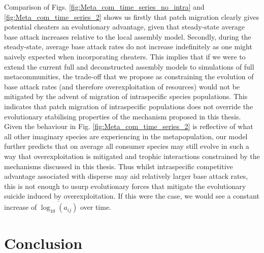 \documentclass[a4paper]{report}
\DeclareMathOperator{\log}{log}
\begin{document}
Comparison of Figs. \ref{fig:Meta_com_time_series_no_intra}  and \ref{fig:Meta_com_time_series_2} shows us firstly that patch migration clearly gives potential cheaters an evolutionary advantage, given that steady-state average base attack increases relative to the local assembly model. Secondly, during the steady-state, average base attack rates do not increase indefinitely as one might naively expected when incorporating cheaters. This implies that if we were to extend the current full and deconstructed assembly models to simulations of full metacommunities, the trade-off that we propose as constraining the evolution of base attack rates (and therefore overexploitation of resources) would not be mitigated by the advent of migration of intraspecific species populations. This indicates that patch migration of intraspecific populations does not override the evolutionary stabilising properties of the mechanism proposed in this thesis. Given the behaviour in Fig. \ref{fig:Meta_com_time_series_2} is reflective of what all other imaginary species are experiencing in the metapopulation, our model further predicts that on average all consumer species may still evolve in such a way that overexploitation is mitigated and trophic interactions constrained by the mechanisms discussed in this thesis. Thus whilst intraspecific competitive advantage associated with disperse may aid relatively larger base attack rates, this is not enough to usurp evolutionary forces that mitigate the evolutionary suicide induced by overexploitation. If this were the case, we would see a constant increase of $\overline{\log_{10}(a_{ij})}$ over time.\\

\section{Conclusion}
\end{document}
